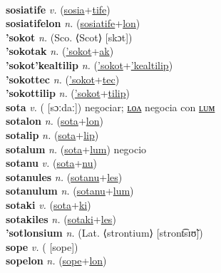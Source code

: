  \label{sosiatafulum} \\
\textbf{sosiatife} \textit{v.} (\hyperref[sosia]{sosia}+\hyperref[tife]{tife})
 \label{sosiatife} \\
\textbf{sosiatifelon} \textit{n.} (\hyperref[sosiatife]{sosiatife}+\hyperref[lon]{lon})
 \label{sosiatifelon} \\
\textbf{'sokot} \textit{n.} (Sco. ⟨Scot⟩ [skɔt])
 \label{'sokot} \\
\textbf{'sokotak} \textit{n.} (\hyperref['sokot]{'sokot}+\hyperref[ak]{ak})
 \label{'sokotak} \\
\textbf{'sokot'kealtilip} \textit{n.} (\hyperref['sokot]{'sokot}+\hyperref['kealtilip]{'kealtilip})
 \label{'sokot'kealtilip} \\
\textbf{'sokottec} \textit{n.} (\hyperref['sokot]{'sokot}+\hyperref[tec]{tec})
 \label{'sokottec} \\
\textbf{'sokottilip} \textit{n.} (\hyperref['sokot]{'sokot}+\hyperref[tilip]{tilip})
 \label{'sokottilip} \\
\textbf{sota} \textit{v.} ( [sɔːdaː])
negociar; \hyperref[sotalon]{ʟᴏᴧ} negocia con \hyperref[sotalum]{ʟᴜᴍ} \label{sota} \\
\textbf{sotalon} \textit{n.} (\hyperref[sota]{sota}+\hyperref[lon]{lon})
 \label{sotalon} \\
\textbf{sotalip} \textit{n.} (\hyperref[sota]{sota}+\hyperref[lip]{lip})
 \label{sotalip} \\
\textbf{sotalum} \textit{n.} (\hyperref[sota]{sota}+\hyperref[lum]{lum})
negocio \label{sotalum} \\
\textbf{sotanu} \textit{v.} (\hyperref[sota]{sota}+\hyperref[nu]{nu})
 \label{sotanu} \\
\textbf{sotanules} \textit{n.} (\hyperref[sotanu]{sotanu}+\hyperref[les]{les})
 \label{sotanules} \\
\textbf{sotanulum} \textit{n.} (\hyperref[sotanu]{sotanu}+\hyperref[lum]{lum})
 \label{sotanulum} \\
\textbf{sotaki} \textit{v.} (\hyperref[sota]{sota}+\hyperref[ki]{ki})
 \label{sotaki} \\
\textbf{sotakiles} \textit{n.} (\hyperref[sotaki]{sotaki}+\hyperref[les]{les})
 \label{sotakiles} \\
\textbf{'sotlonsium} \textit{n.} (Lat. ⟨strontium⟩ [stront͡sɪʊ̃])
 \label{'sotlonsium} \\
\textbf{sope} \textit{v.} ( [sope])
 \label{sope} \\
\textbf{sopelon} \textit{n.} (\hyperref[sope]{sope}+\hyperref[lon]{lon})
